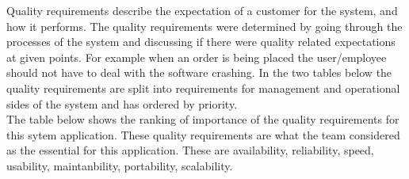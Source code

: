 Quality requirements describe the expectation of a customer for the system, and how it performs. The quality requirements were determined by going through the processes of the system and discussing if there were quality related expectations at given points. For example when an order is being placed the user/employee should not have to deal with the software crashing. In the two tables below the quality requirements are split into requirements for management and operational sides of the system and has ordered by priority.\\

The table below shows the ranking of importance of the quality requirements for this sytem application. These quality requirements are what the team considered as the essential for this application. These are availability, reliability, speed, usability, maintanbility, portability, scalability.\\

